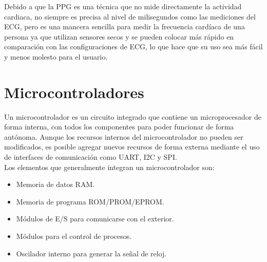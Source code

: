 			Debido a que la PPG es una técnica que no mide directamente la actividad cardiaca, no siempre es precisa al nivel de milisegundos como las mediciones del ECG, pero es una mancera sencilla para medir la frecuencia cardíaca de una persona ya que utilizan sensores secos y se pueden colocar más rápido en comparación con las configuraciones de ECG, lo que hace que su uso sea más fácil y menos molesto para el usuario. \cite{imotionsECG}
		
	\section{Microcontroladores}
	Un microcontrolador es  un  circuito  integrado  que  contiene  un  microprocesador  de  forma  interna,  con  todos  los  componentes  para  poder  funcionar  de  forma  autónoma. Aunque los recursos internos del microcontrolador no pueden ser modificados, es posible agregar nuevos recursos de forma externa mediante el uso de interfaces de comunicación como UART, I2C y SPI. \cite{garcia2017} \\
	
	Los  elementos  que  generalmente  integran  un  microcontrolador  son:
	\begin{itemize}
		\item Memoria de datos RAM.
		\item Memoria de programa ROM/PROM/EPROM.
		\item Módulos de E/S para comunicarse con el exterior.
		\item Módulos para el control de procesos.
		\item Oscilador interno para generar la señal de reloj.
	\end{itemize}

	